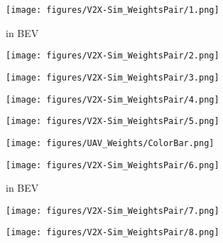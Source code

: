 \documentclass{article}
\begin{document}
\begin{figure}[!t]
  \centering
\begin{subfigure}{0.18\linewidth}
    \texttt{[image: figures/V2X-Sim\_WeightsPair/1.png]}
    \vspace{-5mm}
    \caption{ in BEV}
    \label{fig:UAV_BEVImage1}
  \end{subfigure}
\begin{subfigure}{0.18\linewidth}
    \texttt{[image: figures/V2X-Sim\_WeightsPair/2.png]}
    \vspace{-5mm}
    \caption{}
    \label{fig:UAV_ConfMap1}
  \end{subfigure}
  \begin{subfigure}{0.18\linewidth}
    \texttt{[image: figures/V2X-Sim\_WeightsPair/3.png]}
    \vspace{-5mm}
    \caption{}
    \label{fig:UAV_SelectMat1}
  \end{subfigure}
  \begin{subfigure}{0.18\linewidth}
    \texttt{[image: figures/V2X-Sim\_WeightsPair/4.png]}
    \vspace{-5mm}
    \caption{}
    \label{fig:UAV_AttenWeight1to1}
  \end{subfigure}
\begin{subfigure}{0.18\linewidth}
    \texttt{[image: figures/V2X-Sim\_WeightsPair/5.png]}
    \vspace{-5mm}
    \caption{}
    \label{fig:UAV_DetectionBeforeComm}
  \end{subfigure}
  \begin{subfigure}{0.06\linewidth}
    \texttt{[image: figures/UAV\_Weights/ColorBar.png]}
\end{subfigure}
  \centering
  \begin{subfigure}{0.18\linewidth}
    \texttt{[image: figures/V2X-Sim\_WeightsPair/6.png]}
    \vspace{-5mm}
    \caption{ in BEV}
    \label{fig:UAV_BEVImage2}
  \end{subfigure}
\begin{subfigure}{0.18\linewidth}
    \texttt{[image: figures/V2X-Sim\_WeightsPair/7.png]}
    \vspace{-5mm}
    \caption{}
    \label{fig:UAV_RequestMap2}
  \end{subfigure}
  \begin{subfigure}{0.18\linewidth}
    \texttt{[image: figures/V2X-Sim\_WeightsPair/8.png]}

\end{subfigure}
\end{figure}
\end{document}
